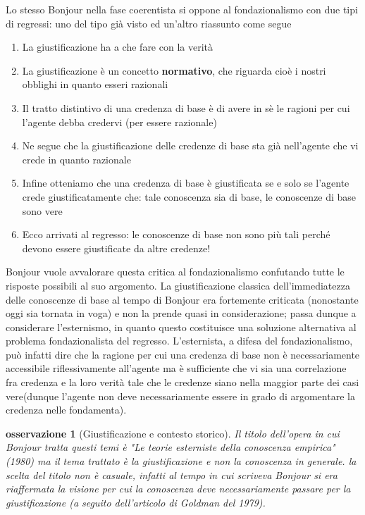 \documentclass[10pt,a4paper]{article}
\newtheorem{osservazione}{osservazione}
\begin{document}
Lo stesso Bonjour nella fase coerentista si oppone al fondazionalismo con due tipi di regressi: uno del tipo già visto ed un'altro riassunto come segue
\begin{enumerate}
	\item La giustificazione ha a che fare con la verità 
	\item La giustificazione è un concetto \textbf{normativo}, che riguarda cioè i nostri obblighi in quanto esseri razionali
	\item Il tratto distintivo di una credenza di base è di avere in sè le ragioni per cui l'agente debba credervi (per essere razionale)
	\item Ne segue che la giustificazione delle credenze di base sta già nell'agente che vi crede in quanto razionale
	\item Infine otteniamo che una credenza di base è giustificata se e solo se l'agente crede giustificatamente che: tale conoscenza sia di base, le conoscenze di base sono vere
	\item Ecco arrivati al regresso: le conoscenze di base non sono più tali perché devono essere giustificate da altre credenze!
\end{enumerate}
Bonjour vuole avvalorare questa critica al fondazionalismo confutando tutte le risposte possibili al suo argomento. La giustificazione classica dell'immediatezza delle conoscenze di base al tempo di Bonjour era fortemente criticata (nonostante oggi sia tornata in voga) e non la prende quasi in considerazione; passa dunque a considerare l'esternismo, in quanto questo costituisce una soluzione alternativa al problema fondazionalista del regresso. L'esternista, a difesa del fondazionalismo, può infatti dire che la ragione per cui una credenza di base non è necessariamente accessibile riflessivamente all'agente ma è sufficiente che vi sia una correlazione fra credenza e la loro verità tale che le credenze siano nella maggior parte dei casi vere(dunque l'agente non deve necessariamente essere in grado di argomentare la credenza nelle fondamenta).
\begin{osservazione}[Giustificazione e contesto storico]
Il titolo dell'opera in cui Bonjour tratta questi temi è "Le teorie esterniste della conoscenza empirica" (1980) ma il tema trattato è la giustificazione e non la conoscenza in generale. la scelta del titolo non è casuale, infatti al tempo in cui scriveva Bonjour si era riaffermata la visione per cui la conoscenza deve necessariamente passare per la giustificazione (a seguito dell'articolo di Goldman del 1979).
\end{osservazione}
\end{document}

